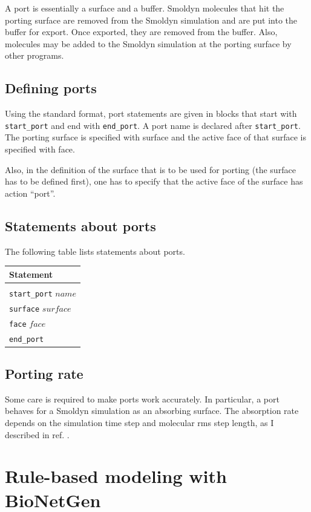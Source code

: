 \documentclass {scrbook}
\newcommand {\ttt} {\texttt}
\begin{document}
A port is essentially a surface and a buffer. Smoldyn molecules that hit the porting surface are removed from the Smoldyn simulation and are put into the buffer for export. Once exported, they are removed from the buffer. Also, molecules may be added to the Smoldyn simulation at the porting surface by other programs.

\section{Defining ports}

Using the standard format, port statements are given in blocks that start with \ttt{start\_port} and end with \ttt{end\_port}. A port name is declared after \ttt{start\_port}. The porting surface is specified with surface and the active face of that surface is specified with face.

Also, in the definition of the surface that is to be used for porting (the surface has to be defined first), one has to specify that the active face of the surface has action ``port''.

\section{Statements about ports}

The following table lists statements about ports.

\begin{longtable}[c]{l}
Statement\\
\hline \\
\ttt{start\_port} $name$\\
\ttt{surface} $surface$\\
\ttt{face} $face$\\
\ttt{end\_port}
\end{longtable}

\section{Porting rate}

Some care is required to make ports work accurately. In particular, a port behaves for a Smoldyn simulation as an absorbing surface. The absorption rate depends on the simulation time step and molecular rms step length, as I described in ref. \cite{Andrews_2009}.


\chapter{Rule-based modeling with BioNetGen}
\end{document}
